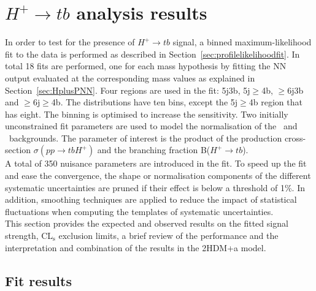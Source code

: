 \chapter{$H^+\to tb$ analysis results}
\label{chapter:Htbresults}

In order to test for the presence of $H^+\to tb$ signal, a binned maximum-likelihood fit to the data is performed as described in Section~\ref{sec:profilelikelihoodfit}. In total 18 fits are performed, one for each mass hypothesis by fitting the NN output evaluated at the corresponding mass values as explained in Section~\ref{sec:HplusPNN}. Four regions are used in the fit: 5j3b, 5j$\geq$4b, $\geq$6j3b and $\geq$6j$\geq$4b. The distributions have ten bins, except the 5j$\geq$4b region that has eight. The binning is optimised to increase the sensitivity. Two initially unconstrained fit parameters are used to model the normalisation of the \ttb\ and \ttc\ backgrounds. The parameter of interest is the product of the production cross-section $\sigma(pp\to tbH^+)$ and the branching fraction B($H^+\to tb$).\\

A total of 350 nuisance parameters are introduced in the fit. To speed up the fit and ease the convergence, the shape or normalisation components of the different systematic uncertainties are pruned if their effect is below a threshold of 1\%. In addition, smoothing techniques are applied to reduce the impact of statistical fluctuations when computing the templates of systematic uncertainties.\\

This section provides the expected and observed results on the fitted signal strength, CL$_{\text{s}}$ exclusion limits, a brief review of the performance and the interpretation and combination of the results in the 2HDM+a model.

\section{Fit results}

